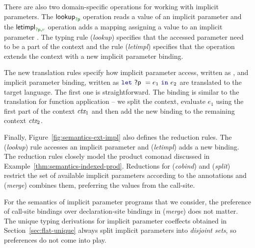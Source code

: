 There are also two domain-specific operations for working with implicit parameters. The
$\ident{lookup}_{\cclrd{\ident{?p}}}$ operation reads a value of an implicit parameter and
the $\ident{letimpl}_{\cclrd{\ident{?p}}, \cclrd{r}}$ operation adds a mapping assigning a value
to an implicit parameter . The typing rule (\emph{lookup}) specifies that the accessed
parameter need to be a part of the context and the rule (\emph{letimpl}) specifies that the
 operation extends the context with a new implicit parameter binding.

The new translation rules specify how implicit parameter access, written as , and
implicit parameter binding, written as $\kvd{let}~\ident{?p}~=e_1~\kvd{in}~e_2$ are translated to the
target language. The first one is straightforward. The binding is similar to the translation for
function application -- we split the context, evaluate $e_1$ using the first part of the context
$\textit{ctx}_1$ and then add the new binding to the remaining context $\textit{ctx}_2$.

Finally, Figure~\ref{fig:semantics-ext-impl} also defines the reduction rules. The (\emph{lookup})
rule accesses an implicit parameter and (\emph{letimpl}) adds a new binding. The reduction rules
closely model the product comonad discussed in Example~\ref{thm:semantics-indexed-prod}. Reductions
for (\emph{cobind}) and (\emph{split}) restrict the set of available implicit parameters according
to the annotations and (\emph{merge}) combines them, preferring the values from the call-site.

For the semantics of implicit parameter programs that we consider, the preference of call-site
bindings over declaration-site bindings in (\emph{merge}) does not matter. The unique typing
derivations for implicit parameter coeffects obtained in Section~\ref{sec:flat-unique} always
split implicit parameters into \emph{disjoint sets}, so preferences do not come into play.


